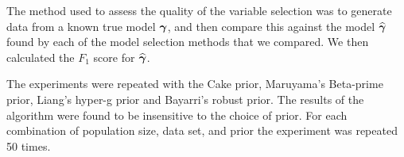 	
		

The method used to assess the quality of the variable selection was to generate data from a known true model
${\boldsymbol \gamma}$, and then compare this against the model $\widehat{{\boldsymbol \gamma}}$ found by each of the model selection
methods that we  compared. We then calculated the $F_1$ score for $\widehat{{\boldsymbol \gamma}}$.





The experiments were repeated with 
the Cake prior, Maruyama's Beta-prime prior, Liang's hyper-g prior and Bayarri's robust prior.
The results of the algorithm were found to be insensitive to the choice of prior.
For each combination of population size, data set, and prior the experiment was repeated 50 times.


